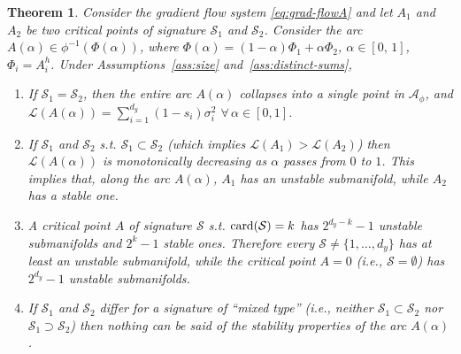 \documentclass{article}
\newtheorem{theorem}[proposition]{Theorem}
\newcommand{\1}{\mathds{1}}
\newcommand{\benu}{\begin{enumerate}}
\newcommand{\eenu}{\end{enumerate}}
\begin{document}
\begin{theorem}
\label{thm:arcs}
Consider the gradient flow system \eqref{eq:grad-flowA} and let $ A_1$ and $ A_2 $ be two critical points of signature $ \mathcal{S}_1 $ and $ \mathcal{S}_2$. Consider the arc $ A(\alpha) \in \phi^{-1}(\Phi(\alpha)) $, where $ \Phi(\alpha) = (1-\alpha) \Phi_1 + \alpha \Phi_2$, $ \alpha \in [0, \, 1 ]$, $ \Phi_i = A_i^h$. Under Assumptions~\ref{ass:size} and~\ref{ass:distinct-sums},
\benu
\item If $ \mathcal{S}_1 =\mathcal{S}_2$, then the entire arc $ A(\alpha) $ collapses into a single point in  $ \mathcal{A}_\phi$, and $ \mathcal{L}(A(\alpha)) = \sum_{i=1}^{d_y} (1- s_i) \sigma_i^2 $ $\forall \, \alpha \in [0, 1]$.

\item If $ \mathcal{S}_1  $ and $ \mathcal{S}_2$ s.t. $ \mathcal{S}_1 \subset \mathcal{S}_2 $ (which implies $ \mathcal{L}(A_1)> \mathcal{L}(A_2)$) then $ \mathcal{L}(A(\alpha)) $ is monotonically decreasing as $ \alpha $ passes from $ 0$ to $ 1$. This implies that, along the arc $ A(\alpha)$, $ A_1 $ has an unstable submanifold, while $ A_2 $ has a stable one. 

\item A critical point $A$ of signature $ \mathcal{S} $ s.t. $ {\rm card}(\mathcal{S})= k $ has $ 2^{d_y-k} -1$ unstable submanifolds and $ 2^k - 1 $ stable ones. Therefore every $ \mathcal{S}\neq \{ 1, \ldots, d_y \}  $ has at least an unstable submanifold, while the critical point $ A=0$  (i.e., $ \mathcal{S}=\emptyset $) has $ 2^{d_y}-1 $ unstable submanifolds. 

\item If $ \mathcal{S}_1  $ and $ \mathcal{S}_2$ differ for a signature of ``mixed type'' (i.e., neither $\mathcal{S}_1 \subset \mathcal{S}_2 $ nor $ \mathcal{S}_1 \supset \mathcal{S}_2 $)  then nothing can be said of the stability properties of the arc $ A(\alpha)$. 
\eenu
\end{theorem}
\end{document}
